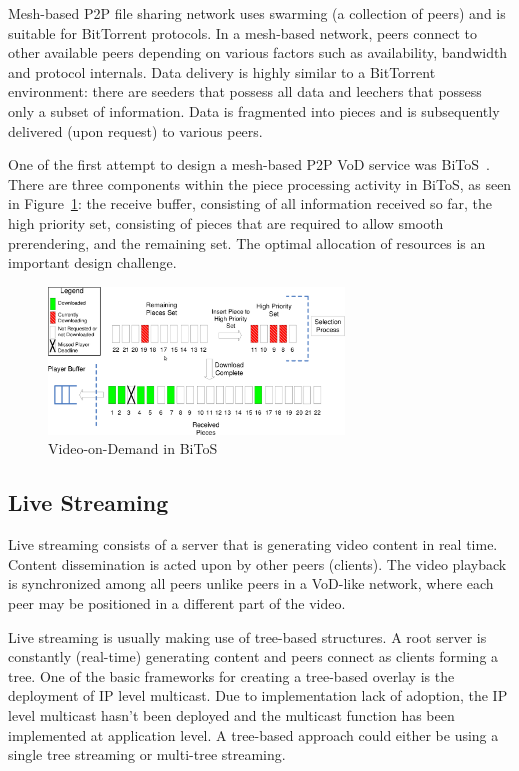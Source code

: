 Mesh-based P2P file sharing network uses swarming (a collection of peers) and
is suitable for BitTorrent protocols. In a mesh-based network, peers connect
to other available peers depending on various factors such as availability,
bandwidth and protocol internals. Data delivery is highly similar to a
BitTorrent environment: there are seeders that possess all data and leechers
that possess only a subset of information. Data is fragmented into pieces and
is subsequently delivered (upon request) to various peers.

One of the first attempt to design a mesh-based P2P VoD service was
BiToS~\cite{bitos}. There are three components within the piece processing
activity in BiToS, as seen in Figure~\ref{fig:p2p-systems:bitos-vod}: the
receive buffer, consisting of all information received so far, the high
priority set, consisting of pieces that are required to allow smooth
prerendering, and the remaining set. The optimal allocation of resources is an
important design challenge.

\begin{figure}
  \centering
  \includegraphics[width=0.7\textwidth]{src/img/p2p-systems/bitos-vod}
  \caption{Video-on-Demand in BiToS}
  \label{fig:p2p-systems:bitos-vod}
\end{figure}

\subsection{Live Streaming}
\label{subsec:p2p-systems:ls}

Live streaming consists of a server that is generating video content in real
time. Content dissemination is acted upon by other peers (clients). The video
playback is synchronized among all peers unlike peers in a VoD-like network,
where each peer may be positioned in a different part of the video.

Live streaming is usually making use of tree-based structures. A root server
is constantly (real-time) generating content and peers connect as clients
forming a tree. One of the basic frameworks for creating a tree-based overlay
is the deployment of IP level multicast. Due to implementation lack of
adoption, the IP level multicast hasn't been deployed and the multicast
function has been implemented at application level. A tree-based approach
could either be using a single tree streaming or multi-tree streaming.

